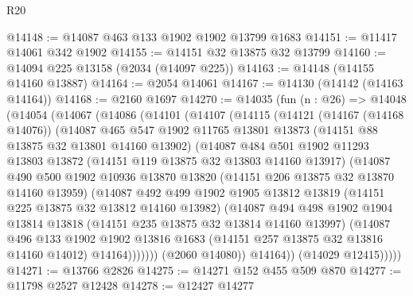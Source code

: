 \begin{lexlean}{R20}
\begin{coremodule}
@14148 := @14087 @463 @133 @1902 @1902 @13799 @1683
@14151 := @11417 @14061 @342 @1902
@14155 := @14151 @32 @13875 @32 @13799
@14160 := @14094 @225 @13158 (@2034 (@14097 @225))
@14163 := @14148 (@14155 @14160 @13887)
@14164 := @2054 @14061
@14167 := @14130 (@14142 (@14163 @14164))
@14168 := @2160 @1697
@14270 := @14035
    (fun (n : @26) =>
    @14048
      (@14054
        (@14067
          (@14086
            (@14101
              (@14107
                (@14115
                  (@14121
                    (@14167 (@14168 @14076))
                    (@14087
                      @465
                      @547
                      @1902
                      @11765
                      @13801
                      @13873
                      (@14151 @88 @13875 @32 @13801 @14160 @13902)
                      (@14087
                        @484
                        @501
                        @1902
                        @11293
                        @13803
                        @13872
                        (@14151 @119 @13875 @32 @13803 @14160 @13917)
                        (@14087
                          @490
                          @500
                          @1902
                          @10936
                          @13870
                          @13820
                          (@14151 @206 @13875 @32 @13870 @14160 @13959)
                          (@14087
                            @492
                            @499
                            @1902
                            @1905
                            @13812
                            @13819
                            (@14151 @225 @13875 @32 @13812 @14160 @13982)
                            (@14087
                              @494
                              @498
                              @1902
                              @1904
                              @13814
                              @13818
                              (@14151 @235 @13875 @32 @13814 @14160 @13997)
                              (@14087
                                @496
                                @133
                                @1902
                                @1902
                                @13816
                                @1683
                                (@14151 @257 @13875 @32 @13816 @14160 @14012)
                                @14164)))))))
                  (@2060 @14080))
                @14164))
            (@14029 @12415)))))
@14271 := @13766 @2826
@14275 := @14271 @152 @455 @509 @870
@14277 := @11798 @2527 @12428
@14278 := @12427 @14277

\end{coremodule}
\end{lexlean}

